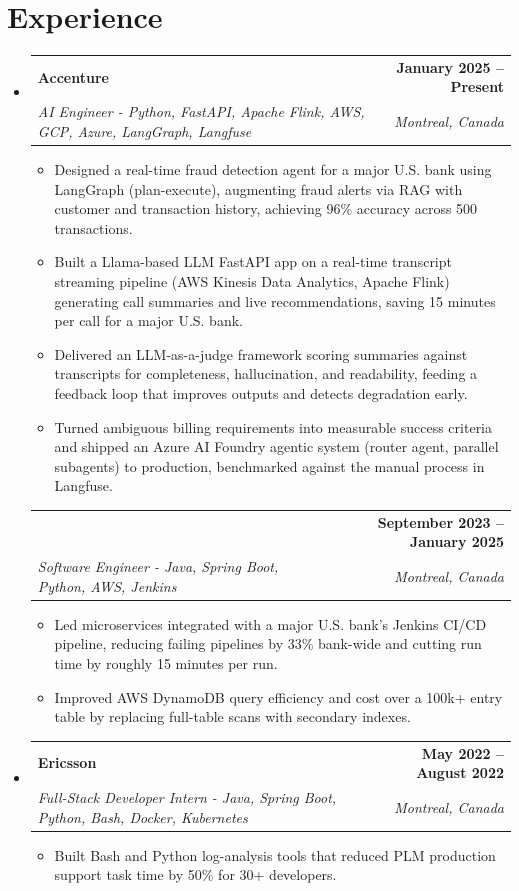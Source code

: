 \documentclass[letterpaper,11pt]{article}
\makeatletter
\newcommand{\resumeItem}[1]{
  \item\small{{#1 \vspace{-2pt}}}
}
\newcommand{\resumeSubheading}[4]{
  \vspace{-2pt}\item
    \begin{tabularx}{1.0\textwidth}[t]{@{}>{\raggedright\arraybackslash}X@{\hspace{8pt}}r@{}}
      \textbf{#1} & \textbf{\small #2} \\
      \textit{\small#3} & \textit{\small #4} \\
    \end{tabularx}\vspace{-7pt}
}
\newcommand{\resumeSubheadingContinued}[3]{
  \vspace{4pt}
    \begin{tabularx}{1.0\textwidth}[t]{@{}>{\raggedright\arraybackslash}X@{\hspace{8pt}}r@{}}
      & \textbf{\small #2} \\
      \textit{\small#1} & \textit{\small #3} \\
    \end{tabularx}\vspace{-7pt}
}
\newcommand{\resumeSubHeadingListStart}{\begin{itemize}[leftmargin=0.0in, label={}]}
\newcommand{\resumeSubHeadingListEnd}{\end{itemize}}
\newcommand{\resumeItemListStart}{\begin{itemize}}
\newcommand{\resumeItemListEnd}{\end{itemize}\vspace{-5pt}}
\makeatother
\begin{document}
\section{Experience}
  \resumeSubHeadingListStart

    \resumeSubheading
      {Accenture}{January 2025 -- Present}
      {AI Engineer - Python, FastAPI, Apache Flink, AWS, GCP, Azure, LangGraph, Langfuse}{Montreal, Canada}
      \resumeItemListStart
        \resumeItem{Designed a real-time fraud detection agent for a major U.S. bank using LangGraph (plan-execute), augmenting fraud alerts via RAG with customer and transaction history, achieving 96\% accuracy across 500 transactions.}
        \resumeItem{Built a Llama-based LLM FastAPI app on a real-time transcript streaming pipeline (AWS Kinesis Data Analytics, Apache Flink) generating call summaries and live recommendations, saving 15 minutes per call for a major U.S. bank.}
        \resumeItem{Delivered an LLM-as-a-judge framework scoring summaries against transcripts for completeness, hallucination, and readability, feeding a feedback loop that improves outputs and detects degradation early.}
        \resumeItem{Turned ambiguous billing requirements into measurable success criteria and shipped an Azure AI Foundry agentic system (router agent, parallel subagents) to production, benchmarked against the manual process in Langfuse.}
      \resumeItemListEnd
      \vspace{-8pt}

    \resumeSubheadingContinued
      {Software Engineer - Java, Spring Boot, Python, AWS, Jenkins}{September 2023 -- January 2025}{Montreal, Canada}
      \resumeItemListStart
        \resumeItem{Led microservices integrated with a major U.S. bank's Jenkins CI/CD pipeline, reducing failing pipelines by 33\% bank-wide and cutting run time by roughly 15 minutes per run.}
        \resumeItem{Improved AWS DynamoDB query efficiency and cost over a 100k+ entry table by replacing full-table scans with secondary indexes.}
      \resumeItemListEnd

    \resumeSubheading
      {Ericsson}{May 2022 -- August 2022}
      {Full-Stack Developer Intern - Java, Spring Boot, Python, Bash, Docker, Kubernetes}{Montreal, Canada}
      \resumeItemListStart
        \resumeItem{Built Bash and Python log-analysis tools that reduced PLM production support task time by 50\% for 30+ developers.}
      \resumeItemListEnd

  \resumeSubHeadingListEnd
\vspace{-11pt}
\end{document}
